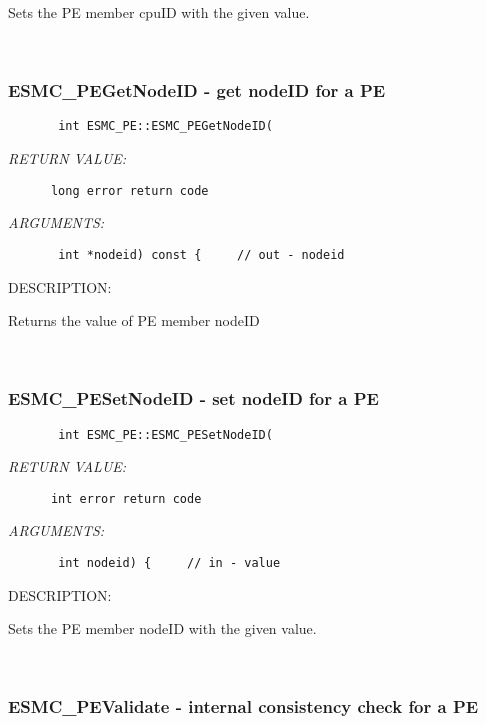        Sets the PE member cpuID with the given value.
   
 
\mbox{}\hrulefill\ 
 
\subsubsection{ESMC\_PEGetNodeID - get nodeID for a PE}


  
\begin{verbatim}       int ESMC_PE::ESMC_PEGetNodeID(\end{verbatim}{\em RETURN VALUE:}
\begin{verbatim}      long error return code\end{verbatim}{\em ARGUMENTS:}
\begin{verbatim}       int *nodeid) const {     // out - nodeid\end{verbatim}
{\sf DESCRIPTION:\\ }


       Returns the value of PE member nodeID
   
 
\mbox{}\hrulefill\ 
 
\subsubsection{ESMC\_PESetNodeID - set nodeID for a PE}


  
\begin{verbatim}       int ESMC_PE::ESMC_PESetNodeID(\end{verbatim}{\em RETURN VALUE:}
\begin{verbatim}      int error return code\end{verbatim}{\em ARGUMENTS:}
\begin{verbatim}       int nodeid) {     // in - value\end{verbatim}
{\sf DESCRIPTION:\\ }


       Sets the PE member nodeID with the given value.
   
 
\mbox{}\hrulefill\ 
 
\subsubsection{ESMC\_PEValidate - internal consistency check for a PE}


